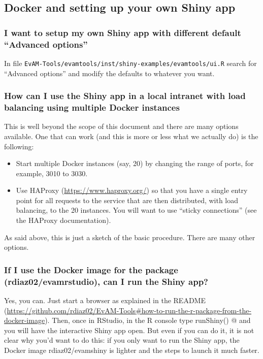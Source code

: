 \documentclass[a4paper,11pt]{article}
\begin{document}
\subsection{Docker and setting up your own Shiny app}
\subsubsection{I want to setup my own Shiny app with different default ``Advanced options''}

In file \texttt{EvAM-Tools/evamtools/inst/shiny-examples/evamtools/ui.R} search for ``Advanced options'' and modify the defaults to whatever you want.


\subsubsection{How can I use the Shiny app in a local intranet with load balancing using multiple Docker instances}
\label{haproxy}

This is well beyond the scope of this document and there are many options available. One that can work (and this is more or less what we actually do) is the following:

\begin{itemize}
\item Start multiple Docker instances (say, 20) by changing the range of ports, for example, 3010 to 3030.
\item Use HAProxy (\url{https://www.haproxy.org/}) so that you have a single entry point for all requests to the service that are then distributed, with load balancing, to the 20 instances. You will want to use ``sticky connections'' (see the HAProxy documentation).
\end{itemize}

As said above, this is just a sketch of the basic procedure. There are many other options.


\subsubsection{If I use the Docker image for the package (rdiaz02/evamrstudio), can I run the Shiny app?}

Yes, you can. Just start a browser as explained in the README (\url{https://github.com/rdiaz02/EvAM-Tools#how-to-run-the-r-package-from-the-docker-image}). Then, once in RStudio, in the R console type \verb@ runShiny() @ and you will have the interactive Shiny app open. But even if you can do it, it is not clear why you'd want to do this: if you only want to run the Shiny app, the Docker image rdiaz02/evamshiny is lighter and the steps to launch it much faster.
\end{document}
